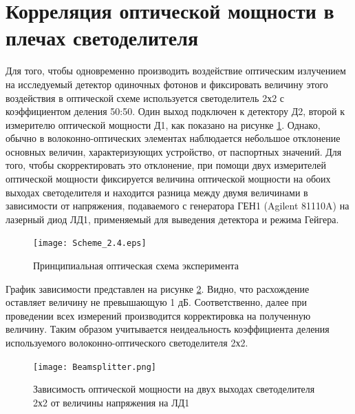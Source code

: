 %
%


\section{Корреляция оптической мощности в плечах светоделителя} \label{sec:ch2/sec4}


Для того, чтобы одновременно производить воздействие оптическим излучением на исследуемый детектор одиночных фотонов и фиксировать величину этого воздействия в оптической схеме используется светоделитель 2х2 с коэффициентом деления 50:50. Один выход подключен к детектору Д2, второй к измерителю оптической мощности Д1, как показано на рисунке \ref{fig:Scheme_2.4}. Однако, обычно в волоконно-оптических элементах наблюдается небольшое отклонение основных величин, характеризующих устройство, от паспортных значений. Для того, чтобы скорректировать это отклонение, при помощи двух измерителей оптической мощности фиксируется величина оптической мощности на обоих выходах светоделителя и находится разница между двумя величинами в зависимости от напряжения, подаваемого с генератора ГЕН1 (Agilent 81110A) на лазерный диод ЛД1, применяемый для выведения детектора и режима Гейгера.   

 \begin{figure}[ht]
  \centering
  \texttt{[image: Scheme\_2.4.eps]}
  \caption{Принципиальная оптическая схема эксперимента}
  \label{fig:Scheme_2.4}
\end{figure}


График зависимости представлен на рисунке \ref{fig:Beamsplitter}. Видно, что расхождение оставляет величину не превышающую 1 дБ. Соответственно, далее при проведении всех измерений производится корректировка на полученную величину. Таким образом учитывается неидеальность коэффициента деления используемого волоконно-оптического светоделителя 2х2. 


 \begin{figure}[ht]
  \centering
  \texttt{[image: Beamsplitter.png]}
  \caption{Зависимость оптической мощности на двух выходах светоделителя 2х2 от величины напряжения на ЛД1}
  \label{fig:Beamsplitter}
\end{figure}
\pagebreak

